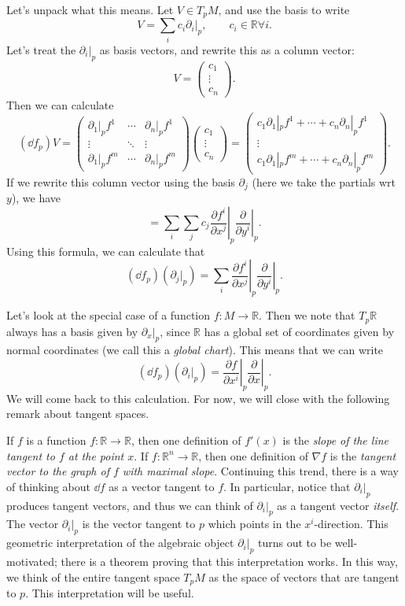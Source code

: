Let's unpack what this means. Let $V\in T_pM$, and use the basis to write
\[
	V = \sum_{i} c_i \partial _i|_p,\qquad c_i\in\mathbb{R} \forall i
.\]
Let's treat the $\partial _i|_p$ as basis vectors, and rewrite this as a column vector:
\[
	V = \begin{pmatrix}
	c_1 \\
	\vdots \\
	c_n
	\end{pmatrix}
.\]
Then we can calculate
\[
	(\dd f_p)V = \begin{pmatrix}
	\partial _1|_pf^1 & \cdots  & \partial _n|_pf^1 \\
	\vdots & \ddots & \vdots \\
	\partial _1|_pf^m & \cdots  & \partial _n|_pf^m
	\end{pmatrix}\begin{pmatrix}
	c_1 \\
	\vdots \\
	c_n
	\end{pmatrix}=\begin{pmatrix}
	c_1 \partial _1 |_p f^1 + \cdots + c_n \partial _n|_p f^1 \\
	\vdots \\
	c_1 \partial _1|_p f^m + \cdots + c_n \partial _n|_pf^m
	\end{pmatrix}
.\]
If we rewrite this column vector using the basis $\partial _j$ (here we take the partials wrt $y$), we have
\[
	= \sum_{i} \sum_{j} c_j \left.\frac{\partial f^i}{\partial x^j} \right|_p \left. \frac{\partial }{\partial y^i} \right|_p
.\]
Using this formula, we can calculate that
\[
	(\dd f_p)(\partial _j|_p) = \sum_{i} \left.\frac{\partial f^i}{\partial x^j} \right|_p \left. \frac{\partial }{\partial y^i} \right|_p
.\]

Let's look at the special case of a function $f : M \to \mathbb{R} $. Then we note that $T_p\mathbb{R}$ always has a basis given by $\partial_x|_p$, since $\mathbb{R} $ has a global set of coordinates given by normal coordinates (we call this a \emph{global chart}). This means that we can write
\[
	(\dd f_p)(\partial _i|_p) = \left.\frac{\partial f}{\partial x^i}\right|_p \left. \frac{\partial }{\partial x} \right|_p
.\]
We will come back to this calculation. For now, we will close with the following remark about tangent spaces.

If $f$ is a function $f : \mathbb{R}  \to \mathbb{R} $, then one definition of $f'(x)$ is the \emph{slope of the line tangent to $f$ at the point $x$}. If $f : \mathbb{R} ^n \to \mathbb{R} $, then one definition of $\nabla f$ is the \emph{tangent vector to the graph of $f$ with maximal slope}. Continuing this trend, there is a way of thinking about $\dd f$ as a vector tangent to $f$. In particular, notice that $\partial _i|_p$ produces tangent vectors, and thus we can think of $\partial _i|_p$ as a tangent vector \emph{itself}. The vector $\partial _i|_p$ is the vector tangent to $p$ which points in the $x^i$-direction. This geometric interpretation of the algebraic object $\partial_i|_p$ turns out to be well-motivated; there is a theorem proving that this interpretation works. In this way, we think of the entire tangent space $T_pM$ as the space of vectors that are tangent to $p$. This interpretation will be useful.
